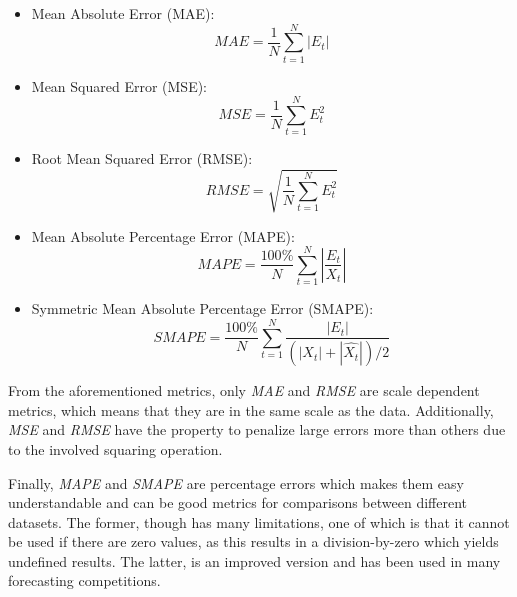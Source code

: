 \documentclass[a4paper, 12pt]{article}
\numberwithin{equation}{section}
\numberwithin{figure}{section}
\numberwithin{table}{section}
\begin{document}
	\vspace*{0.5cm}

	\begin{itemize}
		
		\item Mean Absolute Error (MAE):
		\begin{equation} \label{eq:MAE}
			MAE = \frac{1}{N}\sum_{t=1}^{N}\left | E_t \right |
		\end{equation}
		
		\item Mean Squared Error (MSE):
		\begin{equation} \label{eq:MSE}
			MSE = \frac{1}{N}\sum_{t=1}^{N}E_t^{2} 
		\end{equation}
		
		\item Root Mean Squared Error (RMSE):
		\begin{equation} \label{eq:RMSE}
			RMSE = \sqrt{\frac{1}{N}\sum_{t=1}^{N}E_t^{2}}
		\end{equation}
		
		\item Mean Absolute Percentage Error (MAPE):
		\begin{equation} \label{eq:MAPE}
			MAPE = \frac{100\%}{N} \sum_{t=1}^{N} \left | \frac{E_t }{X_t} \right |
		\end{equation}
		
		\item Symmetric Mean Absolute Percentage Error (SMAPE):
		\begin{equation} \label{eq:SMAPE}
			SMAPE = \frac{100\%}{N} \sum_{t=1}^{N} \frac {\left | E_t \right |}{(|X_t| + |\hat{X_t}|) / 2}
		\end{equation}
		
	\end{itemize}
	
	From the aforementioned metrics, only \textit{MAE} and \textit{RMSE} are scale dependent metrics, which means that they are in the same scale as the data. Additionally, \textit{MSE} and \textit{RMSE} have the property to penalize large errors more than others due to the involved squaring operation.\par
	
	Finally, \textit{MAPE} and \textit{SMAPE} are percentage errors which makes them easy understandable and can be good metrics for comparisons between different datasets. The former, though has many limitations, one of which is that it cannot be used if there are zero values, as this results in a division-by-zero which yields undefined results. The latter, is an improved version and has been used in many forecasting competitions.
\end{document}
